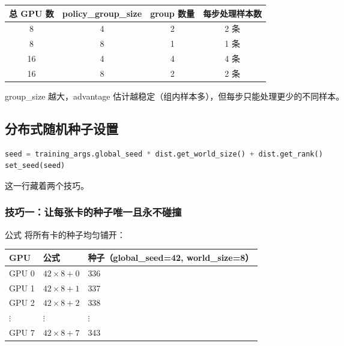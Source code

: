 \begin{center}
\begin{tabular}{cccc}
\hline
\textbf{总 GPU 数} & \textbf{policy\_group\_size} & \textbf{group 数量} & \textbf{每步处理样本数} \\
\hline
8  & 4 & 2 & 2 条 \\
8  & 8 & 1 & 1 条 \\
16 & 4 & 4 & 4 条 \\
16 & 8 & 2 & 2 条 \\
\hline
\end{tabular}
\end{center}

group\_size 越大，advantage 估计越稳定（组内样本多），但每步只能处理更少的不同样本。

\subsection{分布式随机种子设置}

\begin{lstlisting}[language=Python]
seed = training_args.global_seed * dist.get_world_size() + dist.get_rank()
set_seed(seed)
\end{lstlisting}

这一行藏着两个技巧。

\subsubsection{技巧一：让每张卡的种子唯一且永不碰撞}

公式  将所有卡的种子均匀铺开：

\begin{center}
{\small
\begin{tabular}{lll}
\hline
\textbf{GPU} & \textbf{公式} & \textbf{种子（global\_seed=42, world\_size=8）} \\
\hline
GPU 0 & $42 \times 8 + 0$ & 336 \\
GPU 1 & $42 \times 8 + 1$ & 337 \\
GPU 2 & $42 \times 8 + 2$ & 338 \\
$\vdots$ & $\vdots$ & $\vdots$ \\
GPU 7 & $42 \times 8 + 7$ & 343 \\
\hline
\end{tabular}
}
\end{center}

